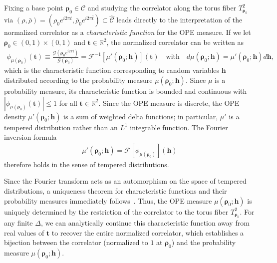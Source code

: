 \documentclass[a4paper,11pt]{article}
\theoremstyle{plain}
\theoremstyle{definition}
\theoremstyle{remark}
\newcommand{\bs}[1]{\boldsymbol{#1}}
\newcommand{\ba}{\begin{equation} \begin{aligned}}
\newcommand{\ea}{\end{aligned} \end{equation}}
\newcommand{\De}{\Delta}
\begin{document}
Fixing a base point $\bs{\rho}_0 \in \mathscr{C}$ and studying the correlator along the torus fiber $T^2_{\bs{\rho}_0}$ via $(\rho, \bar{\rho}) = (\rho_0 e^{i2\pi t}, \bar{\rho}_0 e^{i2\pi \bar{t}}) \subset \widehat{\mathscr{C}}$ leads directly to the interpretation of the normalized correlator as a {\it characteristic function} for the OPE measure. If we let $\bs{\rho}_0 \in (0,1)\times(0,1)$ and $\bs{t} \in \mathbb{R}^2$, the normalized correlator can be written as
\ba
\phi_{\mu(\bs{\rho}_0)}(\bs{t}) \equiv \frac{\mathcal{G}(\bs{\rho}_0 e^{i 2 \pi \bs{t}})}{\mathcal{G}(\bs{\rho}_0)} =  \mathcal{F}^{-1}[ \mu'(\bs{\rho}_0;\bs{h})](\bs{t}) \quad \text{with} \quad d\mu(\bs{\rho}_0;\bs{h}) = \mu'(\bs{\rho}_0;\bs{h}) d\bs{h},
\ea
which is the characteristic function corresponding to random variables $\bs{h}$ distributed according to the probability measure $\mu(\bs{\rho}_0;\bs{h})$. Since $\mu$ is a probability measure, its characteristic function is bounded and continuous with $|\phi_{\mu(\bs{\rho}_0)}(\bs{t})| \leq 1$ for all $\bs{t} \in \mathbb{R}^2$. Since the OPE measure is discrete, the OPE density $\mu'(\bs{\rho}_0;\bs{h})$ is a sum of weighted delta functions; in particular, $\mu'$ is a tempered distribution rather than an $L^1$ integrable function. The Fourier inversion formula
\ba
\label{inversionthm}
\mu'(\bs{\rho}_0;\bs{h}) = \mathcal{F}\left[\phi_{\mu(\bs{\rho}_0)} \right](\bs{h})
\ea
therefore holds in the sense of tempered distributions.
 
Since the Fourier transform acts as an automorphism on the space of tempered distributions, a uniqueness theorem for characteristic functions and their probability measures immediately follows~\cite{Chung2001,Durrett2019}. Thus, the OPE measure $\mu(\bs{\rho}_0;\bs{h})$ is uniquely determined by the restriction of the correlator to the torus fiber $T^2_{\bs{\rho}_0}$. For any finite $\De$, we can analytically continue this characteristic function away from real values of $\bs{t}$ to recover the entire normalized correlator, which establishes a bijection between the correlator (normalized to $1$ at $\bs{\rho}_0$) and the probability measure $\mu(\bs{\rho}_0;\bs{h})$.
 
\end{document}
